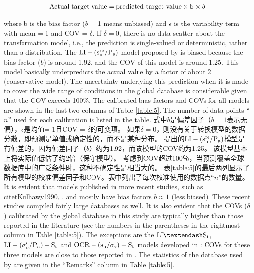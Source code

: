 \begin{Parallel}{0.60\textwidth}{}
{    }
    \ParallelPar
    \begin{align}
        \rm{Actual~ target~value = predicted~target~value\times{}b\times{}\delta}
        \label{equation:1}
    \end{align}
    
    \ParallelLText
    {
        where b is the bias factor ($b$ = 1 means unbiased) and $\epsilon$ is the variability term with mean = 1 and COV = $\delta$. If $\delta = 0$, there is no data scatter about the transformation model, i.e., the prediction is single-valued or deterministic, rather than a distribution. The $\rm{LI}-(s_u^{re}/P_a)$ model proposed by \citet{Locat1988799} is biased because the bias factor ($b$) is around 1.92, and the COV of this model is around 1.25. This model basically underpredicts the actual value by a factor of about 2 (conservative model). The uncertainty underlying this prediction when it is made to cover the wide range of conditions in the global database is considerable given that the COV exceeds 100$\%$. The calibrated bias factors and COVs for all models are shown in the last two columns of Table \ref{table:5}. The number of data points “$n$” used for each calibration is listed in the table.
    }
    \ParallelRText
    {
        式中$b$是偏差因子（$b = 1$表示无偏），$\epsilon$是均值= 1且COV = $ \delta $的可变项。 如果$ \delta = 0 $，则没有关于转换模型的数据分散，即预测是单值或确定性的，而不是某种分布。 \citet{Locat1988799}提出的$\rm{LI}-(s_u^{re}/P_a)$模型是有偏差的，因为偏差因子（$b$）约为1.92，而该模型的COV约为1.25。 该模型基本上将实际值低估了约2倍（保守模型）。 考虑到COV超过100％，当预测覆盖全球数据库中的广泛条件时，这种不确定性是相当大的。 表\ref{table:5}的最后两列显示了所有模型的校准偏差因子和COV。表中列出了每次校准使用的数据点“$n$”的数量。
    }
    \ParallelPar
    \ParallelLText
    {
        It is evident that models published in more recent studies, such as citet{Kulhawy1990}, \citet{Chen1996488}, and \citet{Ching201252, Ching2012522} mostly have bias factors $b\approx{}1$ (less biased). These recent studies compiled fairly large databases as well. It is also evident that the COVs ($\delta$) calibrated by the global database in this study are typically higher than those reported in the literature (see the numbers in the parentheses in the rightmost column in Table \ref{table:5}). The exceptions are the $\rm{LI}–S_t$, $\rm{LI}-(\sigma_p'/P_a)-S_t$ and $\rm{OCR}-(s_u/\sigma_v')-S_t$ models developed in \citet{Ching2012522}: COVs for these three models are close to those reported in \citet{Ching2012522}. The statistics of the database used by \citet{Ching2012522} are given in the “Remarks” column in Table \ref{table:5}. 
}
\end{Parallel}
